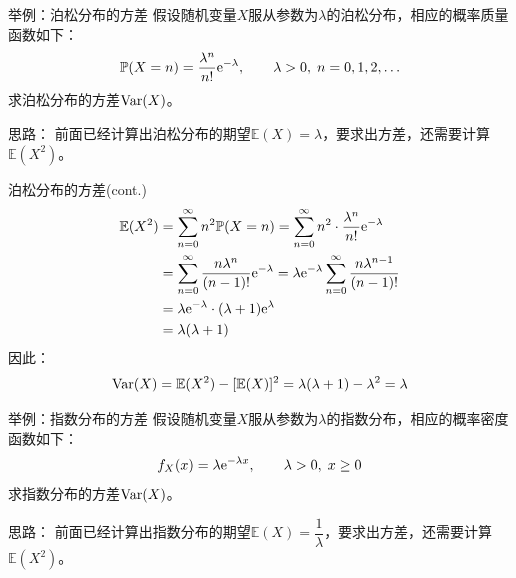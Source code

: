 \documentclass[t]{beamer}
\renewcommand{\Pr}{\mathbb{P}}
\newcommand{\E}{\mathbb{E}}
\newcommand{\Var}{{\rm Var}}
\begin{document}
  \begin{frame}{举例：泊松分布的方差}
    假设随机变量$X$服从参数为$\lambda$的泊松分布，相应的概率质量函数如下：
    \begin{equation*}\Pr(X=n)=\frac{\lambda^n}{n!}{\rm
    e}^{-\lambda}, \qquad \lambda>0, \;
    n=0,1,2,\ldots\end{equation*}
    求泊松分布的方差${\rm Var}(X)$。
  
    \begin{block}{思路：}
      前面已经计算出泊松分布的期望$\E(X)=\lambda$，要求出方差，还需要计算$\E( X^2)$。
    \end{block}
  \end{frame}



  \begin{frame}{泊松分布的方差(cont.)}
    \begin{equation*}\begin{split}
      \E( X^2)&= \sum_{n=0}^{\infty}n^2\Pr(X=n)= \sum_{n=0}^{\infty}
      n^2\cdot \frac{\lambda^n}{n!}{\rm e}^{-\lambda}\\
      &= \sum_{n=0}^{\infty}\frac{n\lambda^n}{(n-1)!}{\rm
      e}^{-\lambda}=\lambda {\rm e}^{-\lambda}
      \sum_{n=0}^{\infty}\frac{n\lambda^{n-1}}{(n-1)!}\\
      &=\lambda {\rm e}^{-\lambda}\cdot
      (\lambda+1){\rm e}^{\lambda} \\
      &=\lambda(\lambda+1) 
      \end{split} \end{equation*}
      因此：
      \begin{equation*}\Var(X)=\E (X^2)-[\E
      (X)]^2=\lambda(\lambda+1)-\lambda^2=\lambda \end{equation*}
  \end{frame}


  \begin{frame}{举例：指数分布的方差}
    假设随机变量$X$服从参数为$\lambda$的指数分布，相应的概率密度函数如下：
    \begin{equation*}f_X(x)=\lambda {\rm e}^{-\lambda x}, \qquad
    \lambda>0, \;x\ge 0 \end{equation*}
      求指数分布的方差$\Var(X)$。
  
      \begin{block}{思路：}
        前面已经计算出指数分布的期望$\E(X)=\dfrac{1}{\lambda}$，要求出方差，还需要计算$\E( X^2)$。
      \end{block}
  \end{frame}
  
\end{document}
